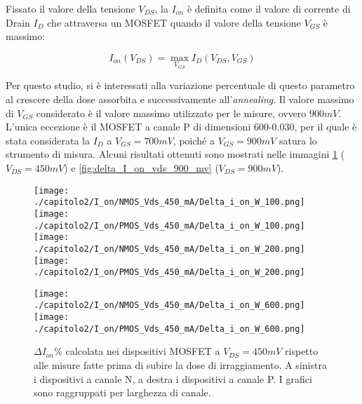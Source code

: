 Fissato il valore della tensione $V_{DS}$, la $I_{on}$ è definita come il valore di corrente di Drain $I_D$ che attraversa un MOSFET quando il valore della tensione $V_{GS}$ è massimo:

\begin{equation}
    I_{on}(V_{DS}) = \max_{V_{GS}} I_D(V_{DS},V_{GS})
\end{equation}

Per questo studio, si è interessati alla variazione percentuale di questo parametro al crescere della dose assorbita e successivamente all'\emph{annealing}. Il valore massimo di $V_{GS}$ considerato è il valore massimo utilizzato per le misure, ovvero $900 mV$. L'unica eccezione è il MOSFET a canale P di dimensioni 600-0.030, per il quale è stata considerata la $I_D$ a $V_{GS} = 700 mV$, poiché a $V_{GS} = 900mV$ satura lo strumento di misura. Alcuni risultati ottenuti sono mostrati nelle immagini \ref{fig:delta_I_on_vds_450_mv} ($V_{DS} = 450 mV$) e \ref{fig:delta_I_on_vds_900_mv} ($V_{DS} = 900 mV$).

\begin{figure}[h]
    \centering
    \texttt{[image: ./capitolo2/I\_on/NMOS\_Vds\_450\_mA/Delta\_i\_on\_W\_100.png]}
    \texttt{[image: ./capitolo2/I\_on/PMOS\_Vds\_450\_mA/Delta\_i\_on\_W\_100.png]}\\
    \vspace{0.2cm}
    \texttt{[image: ./capitolo2/I\_on/NMOS\_Vds\_450\_mA/Delta\_i\_on\_W\_200.png]}
    \texttt{[image: ./capitolo2/I\_on/PMOS\_Vds\_450\_mA/Delta\_i\_on\_W\_200.png]}\\
    \vspace{0.2cm}

    \texttt{[image: ./capitolo2/I\_on/NMOS\_Vds\_450\_mA/Delta\_i\_on\_W\_600.png]}
    \texttt{[image: ./capitolo2/I\_on/PMOS\_Vds\_450\_mA/Delta\_i\_on\_W\_600.png]}

    \caption[Dati $\Delta I_{on}\%$ a $V_{DS}=440mV$ ]{$\Delta I_{on}\%$ calcolata nei dispositivi MOSFET a $V_{DS} = 450mV$ rispetto alle misure fatte prima di subire la dose di irraggiamento. A sinistra i dispositivi a canale N, a destra i dispositivi a canale P. I grafici sono raggruppati per larghezza di canale.}
    \label{fig:delta_I_on_vds_450_mv}

\end{figure}

